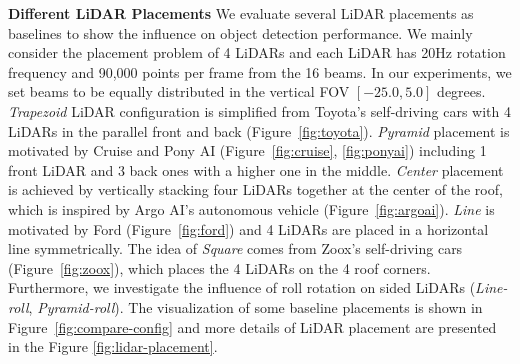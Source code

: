 \documentclass[10pt,twocolumn,letterpaper]{article}
\newcommand{\todo}[1]{\hl{[#1]}}
\begin{document}
\textbf{Different LiDAR Placements} We evaluate several LiDAR placements as baselines to show the influence on object detection performance. We mainly consider the placement problem of 4 LiDARs and each LiDAR has 20Hz rotation frequency and 90,000 points per frame from the 16 beams.
In our experiments, we set beams to be equally distributed in the vertical FOV $[-25.0, 5.0]$ degrees.
\textit{Trapezoid} LiDAR configuration is simplified from  Toyota's self-driving cars with 4 LiDARs in the parallel front and back (Figure~\ref{fig:toyota}). \textit{Pyramid} placement is motivated by Cruise and Pony AI (Figure~\ref{fig:cruise}, \ref{fig:ponyai}) including 1 front LiDAR and 3 back ones with a higher one in the middle.
 \textit{Center} placement is achieved by vertically stacking four LiDARs together at the center of the roof, which is inspired by Argo AI's autonomous vehicle (Figure~\ref{fig:argoai}). \textit{Line} is motivated by Ford (Figure~\ref{fig:ford}) and 4 LiDARs are placed in a horizontal line symmetrically.  The idea of \textit{Square} comes from Zoox's self-driving cars (Figure~\ref{fig:zoox}), which places the 4 LiDARs on the 4 roof corners.
Furthermore, we investigate the influence of roll rotation on sided LiDARs (\textit{Line-roll}, \textit{Pyramid-roll}).
The visualization of some baseline placements is shown in Figure~\ref{fig:compare-config}
and more details of LiDAR placement are presented in the Figure \ref{fig:lidar-placement}.


\end{document}
